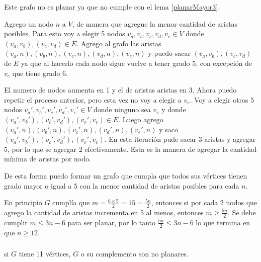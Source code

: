 Este grafo no es planar ya que no cumple con el lema \ref{planarMayor3}.

Agrego un nodo $n$ a $V$, de manera que agregue la menor cantidad de aristas posibles. Para esto voy a elegir 5 nodos $v_a, v_b, v_c, v_d, v_e \in V$ donde $(v_a, v_b), (v_c, v_d) \in E$. Agrego al grafo las aristas $(v_a, n), (v_b, n), (v_c, n), (v_d, n), (v_e, n)$ y puedo sacar $(v_a, v_b), (v_c, v_d)$ de $E$ ya que al hacerlo cada nodo sigue vuelve a tener grado 5, con excepción de $v_e$ que tiene grado 6.

El numero de nodos aumenta en 1 y el de aristas aristas en 3. Ahora puedo repetir el proceso anterior, pero esta vez no voy a elegir a $v_e$. Voy a elegir otros 5 nodos $v_a', v_b', v_c', v_d', v_e' \in V$ donde ninguno sea $v_e$ y donde $(v_a', v_b'), (v_c', v_d'), (v_e', v_e) \in E$. Luego agrego $(v_a', n), (v_b', n), (v_c', n), (v_d', n), (v_e', n)$ y saco $(v_a', v_b'), (v_c', v_d'), (v_e', v_e)$. En esta iteración pude sacar 3 aristas y agregar 5, por lo que se agregar 2 efectivamente. Esta es la manera de agregar la cantidad mínima de aristas por nodo.

De esta forma puedo formar un grafo que cumpla que todos sus vértices tienen grado mayor o igual a 5 con la menor cantidad de aristas posibles para cada $n$.

En principio $G$ cumplía que $m = \frac{6 \times 5}{2} = 15 = \frac{5 n}{2}$, entonces si por cada 2 nodos que agrego la cantidad de aristas incrementa en 5 al menos, entonces $m \geq \frac{5 n}{2}$. Se debe cumplir $m \leq 3n - 6$ para ser planar, por lo tanto $\frac{5 n}{2} \leq 3n - 6$ lo que termina en que $n \geq 12$.

\subsubsection{}

\begin{lema}
	si $G$ tiene 11 vértices, $G$ o su complemento son no planares.
\end{lema}


